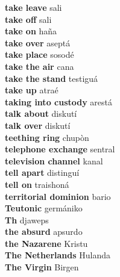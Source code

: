 \textbf{ take leave  } sali \\
\textbf{ take off  } sali \\
\textbf{ take on  } haña \\
\textbf{ take over  } aseptá \\
\textbf{ take place  } sosodé \\
\textbf{ take the air  } cana \\
\textbf{ take the stand  } testiguá \\
\textbf{ take up  } atraé \\
\textbf{ taking into custody  } arestá \\
\textbf{ talk about  } diskutí \\
\textbf{ talk over  } diskutí \\
\textbf{ teething ring  } chupòn \\
\textbf{ telephone exchange  } sentral \\
\textbf{ television channel  } kanal \\
\textbf{ tell apart  } distinguí \\
\textbf{ tell on  } traishoná \\
\textbf{ territorial dominion  } bario \\
\textbf{ Teutonic  } germániko \\
\textbf{ Th  } djaweps \\
\textbf{ the absurd  } apsurdo \\
\textbf{ the Nazarene  } Kristu \\
\textbf{ The Netherlands  } Hulanda \\
\textbf{ The Virgin  } Birgen \\
